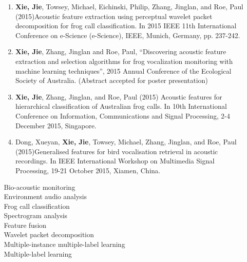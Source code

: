 \begin{enumerate}
\item	\textbf{Xie, Jie}, Towsey, Michael, Eichinski, Philip, Zhang, Jinglan, and Roe, Paul (2015)Acoustic feature extraction using perceptual wavelet packet decomposition for frog call classification. In 2015 IEEE 11th International Conference on e-Science (e-Science), IEEE, Munich, Germany, pp. 237-242.

\item	\textbf{Xie, Jie}, Zhang, Jinglan and Roe, Paul,  “Discovering acoustic feature extraction and selection algorithms for frog vocalization monitoring with machine learning techniques”, 2015 Annual Conference of the Ecological Society of Australia. (Abstract accepted for poster presentation) 

\item	\textbf{Xie, Jie}, Zhang, Jinglan, and Roe, Paul (2015) Acoustic features for hierarchical classification of Australian frog calls. In 10th International Conference on Information, Communications and Signal Processing, 2-4 December 2015, Singapore.

\item	Dong, Xueyan, \textbf{Xie, Jie}, Towsey, Michael, Zhang, Jinglan, and Roe, Paul (2015)Generalised features for bird vocalisation retrieval in acoustic recordings. In IEEE International Workshop on Multimedia Signal Processing, 19-21 October 2015, Xiamen, China.

\end{enumerate} 



\begin{keywords}
Bio-acoustic monitoring \\
Environment audio analysis \\
Frog call classification \\
Spectrogram analysis \\
Feature fusion \\
Wavelet packet decomposition \\
Multiple-instance multiple-label learning \\
Multiple-label learning \\
 
\end{keywords}

